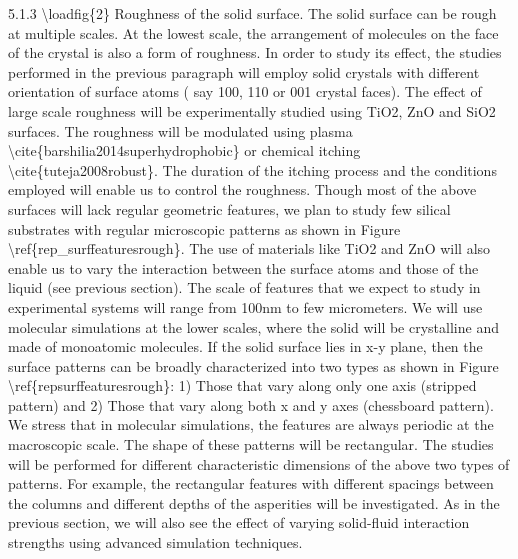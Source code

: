 \par 5.1.3 \textbackslash loadfig\{2\} Roughness of the solid surface. The solid surface can be rough at multiple scales. At the lowest scale, the arrangement of molecules on the face of the crystal is also a form of roughness. In order to study its effect, the studies performed in the previous paragraph will employ solid crystals with different orientation of surface atoms ( say 100, 110 or 001 crystal faces). The effect of large scale roughness will be experimentally studied using TiO2, ZnO and SiO2 surfaces. The roughness will be modulated using plasma \textbackslash cite\{barshilia2014superhydrophobic\} or chemical itching \textbackslash cite\{tuteja2008robust\}. The duration of the itching process and the conditions employed will enable us to control the roughness. Though most of the above surfaces will lack regular geometric features, we plan to study few silical substrates with regular microscopic patterns as shown in Figure \textbackslash ref\{rep\_surffeaturesrough\}. The use of materials like TiO2 and ZnO will also enable us to vary the interaction between the surface atoms and those of the liquid (see previous section). The scale of features that we expect to study in experimental systems will range from 100nm to few micrometers. We will use molecular simulations at the lower scales, where the solid will be crystalline and made of monoatomic molecules. If the solid surface lies in x-y plane, then the surface patterns can be broadly characterized into two types as shown in Figure \textbackslash ref\{repsurffeaturesrough\}: 1) Those that vary along only one axis (stripped pattern) and 2) Those that vary along both x and y axes (chessboard pattern).  We stress that in molecular simulations, the features are always periodic at the macroscopic scale. The shape of these patterns will be rectangular. The studies will be performed for different characteristic dimensions of the above two types of patterns. For example, the rectangular features with different spacings between the columns and different depths of the asperities will be investigated.  As in the previous section, we will also see the effect of varying solid-fluid interaction strengths using advanced simulation techniques.
